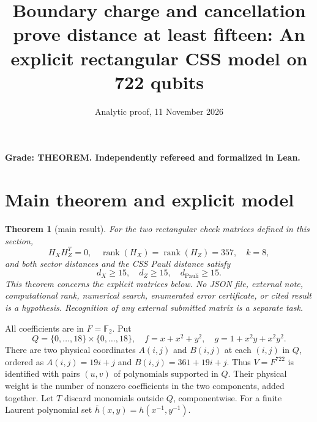 \documentclass{article}
\title{Boundary charge and cancellation prove distance at least fifteen: An explicit rectangular CSS model on 722 qubits}
\author{}
\date{Analytic proof, 11 November 2026}
\newtheorem{theorem}{Theorem}
\DeclareMathOperator{\rank}{rank}
\newcommand{\Ftwo}{\mathbb{F}_2}
\begin{document}
\maketitle

\textbf{Grade: THEOREM. Independently refereed and formalized in Lean.}

\section{Main theorem and explicit model}\label{sec:model}

\begin{theorem}[main result]\label{thm:main}
  For the two rectangular check matrices defined in this section,
  \begin{equation}
    H_X H_Z^T=0, \quad
    \rank(H_X)=\rank(H_Z)=357, \quad k=8,
  \end{equation}
  and both sector distances and the CSS Pauli distance satisfy
  \begin{equation}
    d_X\ge 15, \quad d_Z\ge 15, \quad d_{\text{Pauli}}\ge 15.
  \end{equation}
  This theorem concerns the explicit matrices below. No JSON file,
  external note, computational rank, numerical search, enumerated error
  certificate, or cited result is a hypothesis. Recognition of any external
  submitted matrix is a separate task.
\end{theorem}

All coefficients are in \(F=\Ftwo\). Put
\begin{equation}
  Q=\{0,\dots,18\}\times\{0,\dots,18\}, \quad
  f=x+x^2+y^2, \quad g=1+x^2y+x^2y^2.
\end{equation}
There are two physical coordinates \(A(i,j)\) and \(B(i,j)\) at each \((i,j)\)
in \(Q\), ordered as \(A(i,j)=19i+j\) and \(B(i,j)=361+19i+j\).
Thus \(V=F^{722}\) is identified with pairs \((u,v)\) of polynomials supported
in \(Q\). Their physical weight is the number of nonzero coefficients in
the two components, added together. Let \(T\) discard monomials outside
\(Q\), componentwise. For a finite Laurent polynomial set
\(\overline{h}(x,y)=h(x^{-1},y^{-1})\).
\end{document}

